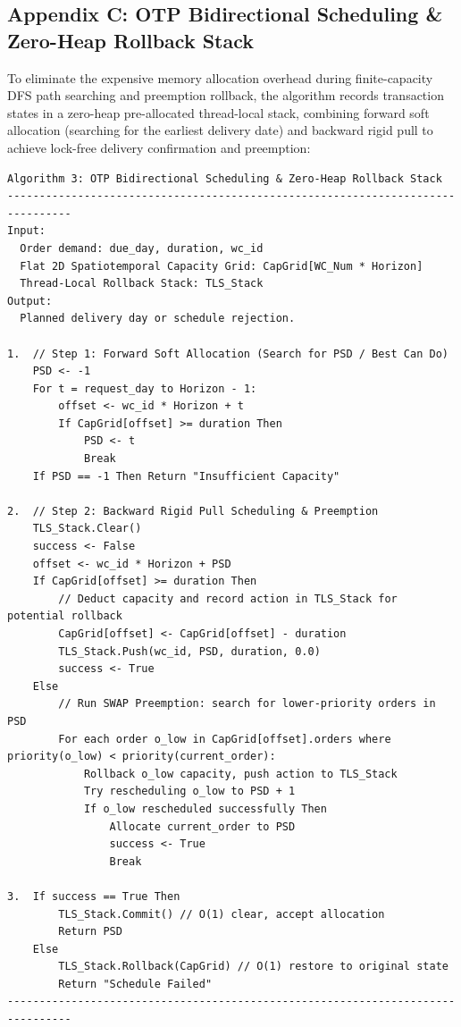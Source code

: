 \documentclass{article}
\begin{document}
\subsection*{Appendix C: OTP Bidirectional Scheduling \& Zero-Heap Rollback Stack}

To eliminate the expensive memory allocation overhead during finite-capacity DFS path searching and preemption rollback, the algorithm records transaction states in a zero-heap pre-allocated thread-local stack, combining forward soft allocation (searching for the earliest delivery date) and backward rigid pull to achieve lock-free delivery confirmation and preemption:

\begin{verbatim}
Algorithm 3: OTP Bidirectional Scheduling & Zero-Heap Rollback Stack
--------------------------------------------------------------------------------
Input:
  Order demand: due_day, duration, wc_id
  Flat 2D Spatiotemporal Capacity Grid: CapGrid[WC_Num * Horizon]
  Thread-Local Rollback Stack: TLS_Stack
Output:
  Planned delivery day or schedule rejection.

1.  // Step 1: Forward Soft Allocation (Search for PSD / Best Can Do)
    PSD <- -1
    For t = request_day to Horizon - 1:
        offset <- wc_id * Horizon + t
        If CapGrid[offset] >= duration Then
            PSD <- t
            Break
    If PSD == -1 Then Return "Insufficient Capacity"

2.  // Step 2: Backward Rigid Pull Scheduling & Preemption
    TLS_Stack.Clear()
    success <- False
    offset <- wc_id * Horizon + PSD
    If CapGrid[offset] >= duration Then
        // Deduct capacity and record action in TLS_Stack for potential rollback
        CapGrid[offset] <- CapGrid[offset] - duration
        TLS_Stack.Push(wc_id, PSD, duration, 0.0)
        success <- True
    Else
        // Run SWAP Preemption: search for lower-priority orders in PSD
        For each order o_low in CapGrid[offset].orders where priority(o_low) < priority(current_order):
            Rollback o_low capacity, push action to TLS_Stack
            Try rescheduling o_low to PSD + 1
            If o_low rescheduled successfully Then
                Allocate current_order to PSD
                success <- True
                Break

3.  If success == True Then
        TLS_Stack.Commit() // O(1) clear, accept allocation
        Return PSD
    Else
        TLS_Stack.Rollback(CapGrid) // O(1) restore to original state
        Return "Schedule Failed"
--------------------------------------------------------------------------------
\end{verbatim}
\end{document}
